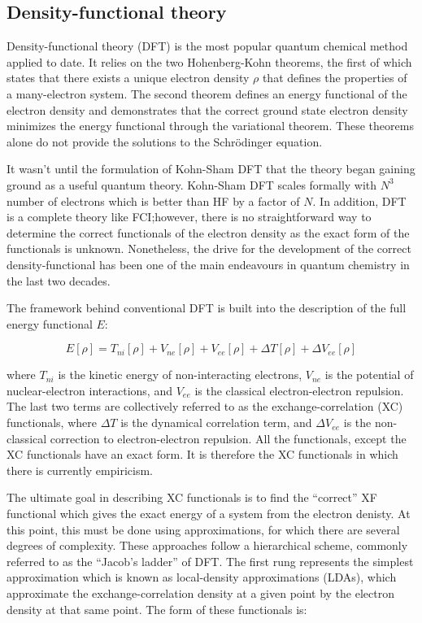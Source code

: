 \subsection{Density-functional theory}

Density-functional theory (DFT) is the most popular quantum chemical method applied to date. It relies on the two Hohenberg-Kohn theorems, the first of which states that there exists a unique electron density $\rho$ that defines the properties of a many-electron system. The second theorem defines an energy functional of the electron density and demonstrates that the correct ground state electron density minimizes the energy functional through the variational theorem.\cite{Hohenberg1964,Koch2000} These theorems alone do not provide the solutions to the Schr{\"o}dinger equation.

It wasn't until the formulation of Kohn-Sham DFT\cite{Kohn1965} that the theory began gaining ground as a useful quantum theory. Kohn-Sham DFT scales formally with $N^3$ number of electrons\cite{Cramer2004} which is better than HF by a factor of $N$. In addition, DFT is a complete theory like FCI;\@ however, there is no straightforward way to determine the correct functionals of the electron density as the exact form of the functionals is unknown. Nonetheless, the drive for the development of the correct density-functional has been one of the main endeavours in quantum chemistry in the last two decades.

The framework behind conventional DFT is built into the description of the full energy functional $E$:

\begin{equation}
  E[\rho] = T_{ni}[\rho] + V_{ne}[\rho] + V_{ee}[\rho] + \Delta T[\rho] + \Delta V_{ee}[\rho]
\label{eq:DFT}
\end{equation}

\noindent where $T_{ni}$ is the kinetic energy of non-interacting electrons, $V_{ne}$ is the potential of nuclear-electron interactions, and $V_{ee}$ is the classical electron-electron repulsion. The last two terms are collectively referred to as the exchange-correlation (XC) functionals, where $\Delta T$ is the dynamical correlation term, and $\Delta V_{ee}$ is the non-classical correction to electron-electron repulsion. All the functionals, except the XC functionals have an exact form. It is therefore the XC functionals in which there is currently empiricism.

The ultimate goal in describing XC functionals is to find the ``correct'' XF functional which gives the exact energy of a system from the electron denisty. At this point, this must be done using approximations, for which there are several degrees of complexity. These approaches follow a hierarchical scheme, commonly referred to as the ``Jacob's ladder'' of DFT.\cite{Perdew2005} The first rung represents the simplest approximation which is known as local-density approximations (LDAs), which approximate the exchange-correlation density at a given point by the electron density at that same point. The form of these functionals is:

